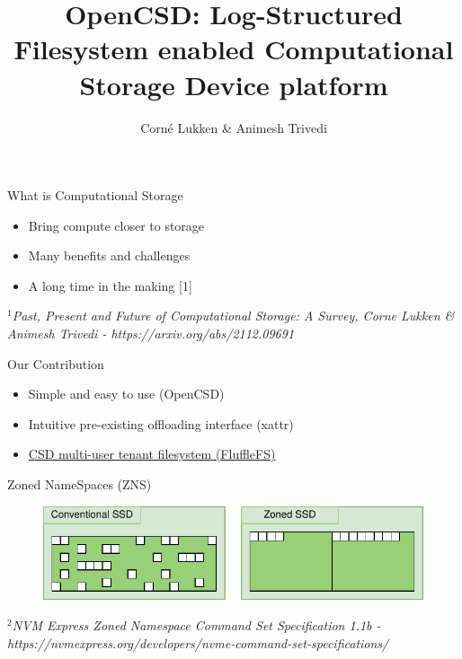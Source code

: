 \documentclass{beamer}
\author{Corné Lukken \& Animesh Trivedi}
\title{OpenCSD: Log-Structured Filesystem enabled Computational Storage Device
platform}
\begin{document}
\frame{\titlepage}
\begin{frame}{What is Computational Storage}
	\begingroup
	\small
	\begin{itemize}
		\item Bring compute closer to storage
		\item Many benefits and challenges %
		\item A long time in the making [1] %
	\end{itemize}
	\textit{\tiny $^{1}$Past, Present and Future of Computational Storage: A
	Survey, Corne Lukken \& Animesh Trivedi - https://arxiv.org/abs/2112.09691}
	\endgroup
\end{frame}


\begin{frame}{Our Contribution}
	\begingroup
	\small
	\begin{itemize}
		\item Simple and easy to use (OpenCSD)
		\item Intuitive pre-existing offloading interface (xattr)
		\item \underline{CSD multi-user tenant filesystem (FluffleFS)} %
	\end{itemize}
	\endgroup
\end{frame}

\begin{frame}{Zoned NameSpaces (ZNS)}
	\begingroup
	\small
	\begin{figure}
		\centering
		\includegraphics[width=1\textwidth]{resources/images/zns-vs-conventional-layout.pdf}
	\end{figure}
	\textit{\tiny $^{2}$NVM Express Zoned Namespace Command Set Specification 1.1b - 
	https://nvmexpress.org/developers/nvme-command-set-specifications/}
	\endgroup
\end{frame}
\end{document}
